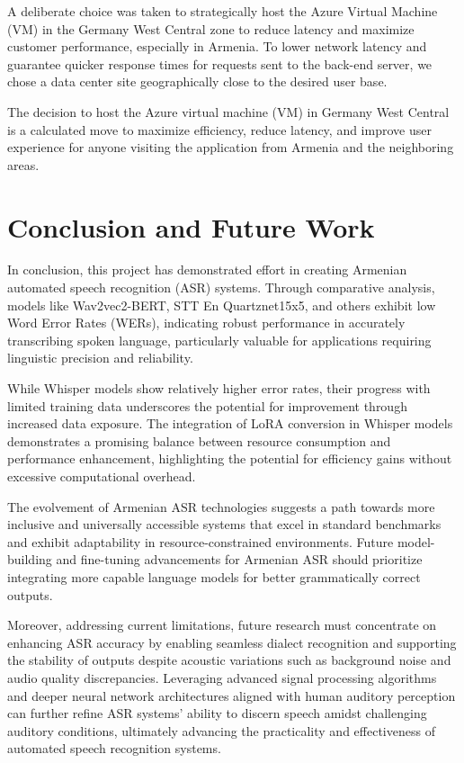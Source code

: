 \documentclass[conference]{IEEEtran}
\begin{document}
A deliberate choice was taken to strategically host the Azure Virtual Machine (VM) in the Germany West Central zone to reduce latency and maximize customer performance, especially in Armenia. To lower network latency and guarantee quicker response times for requests sent to the back-end server, we chose a data center site geographically close to the desired user base.

The decision to host the Azure virtual machine (VM) in Germany West Central is a calculated move to maximize efficiency, reduce latency, and improve user experience for anyone visiting the application from Armenia and the neighboring areas.

\section{Conclusion and Future Work}

In conclusion, this project has demonstrated effort in creating Armenian automated speech recognition (ASR) systems. Through comparative analysis, models like Wav2vec2-BERT, STT En Quartznet15x5, and others exhibit low Word Error Rates (WERs), indicating robust performance in accurately transcribing spoken language, particularly valuable for applications requiring linguistic precision and reliability.

While Whisper models show relatively higher error rates, their progress with limited training data underscores the potential for improvement through increased data exposure. The integration of LoRA conversion in Whisper models demonstrates a promising balance between resource consumption and performance enhancement, highlighting the potential for efficiency gains without excessive computational overhead.

The evolvement of Armenian ASR technologies suggests a path towards more inclusive and universally accessible systems that excel in standard benchmarks and exhibit adaptability in resource-constrained environments. Future model-building and fine-tuning advancements for Armenian ASR should prioritize integrating more capable language models for better grammatically correct outputs. 

Moreover, addressing current limitations, future research must concentrate on enhancing ASR accuracy by enabling seamless dialect recognition and supporting the stability of outputs despite acoustic variations such as background noise and audio quality discrepancies. Leveraging advanced signal processing algorithms and deeper neural network architectures aligned with human auditory perception can further refine ASR systems' ability to discern speech amidst challenging auditory conditions, ultimately advancing the practicality and effectiveness of automated speech recognition systems.


  
 
\end{document}
